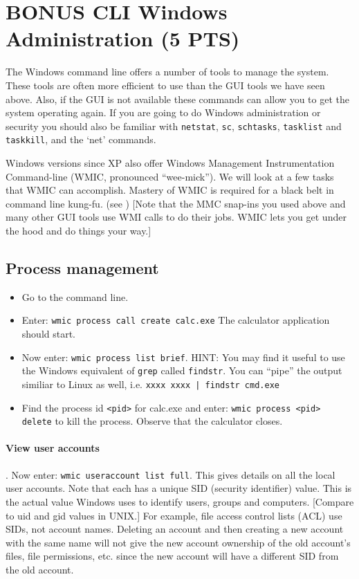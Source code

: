\documentclass{article}
\begin{document}
\section{BONUS CLI Windows Administration (5 PTS)}
The Windows command line offers a number of tools to manage the system. These tools are often more efficient to use than the GUI tools we have seen above.  Also, if the GUI is not available these commands can allow you to get the system operating again. If you are going to do Windows administration or security you should also be familiar with {\tt netstat}, {\tt sc}, {\tt schtasks}, {\tt tasklist} and {\tt taskkill}, and the `net' commands.

Windows versions since XP also offer Windows Management Instrumentation Command-line (WMIC, pronounced ``wee-mick''). We will look at a few tasks that WMIC can accomplish. Mastery of WMIC is required for a black belt in command line kung-fu. (see )   [Note that the MMC snap-ins you used above and many other GUI tools use WMI calls to do their jobs. WMIC lets you get under the hood and do things your way.] 

\subsection{Process management}
 \begin{itemize}
 \item  Go to the command line.
 \item Enter:  {\tt wmic process call create calc.exe}   The calculator application should start.
 \item Now enter:  {\tt wmic process list brief}. HINT: You may find it useful to use the Windows equivalent of {\tt grep} called {\tt findstr}.  You can ``pipe'' the output similiar to Linux as well, i.e. {\tt xxxx xxxx | findstr cmd.exe} 

 \item Find the process id {\tt<pid>} for calc.exe and enter:  {\tt wmic process <pid> delete} to kill the process. Observe that the calculator closes.
 \end{itemize}
 
  
  
  
\paragraph{View user accounts}. 
Now enter: {\tt wmic useraccount list full}. This gives details on all the local user accounts. Note that each has a unique SID (security identifier) value. This is the actual value Windows uses to identify users, groups and computers. [Compare to uid and gid values in UNIX.] For example, file access control lists (ACL) use SIDs, not account names. Deleting an account and then creating a new account with the same name will not give the new account ownership of the old account’s files, file permissions, etc. since the new account will have a different SID from the old account. \\
\end{document}
